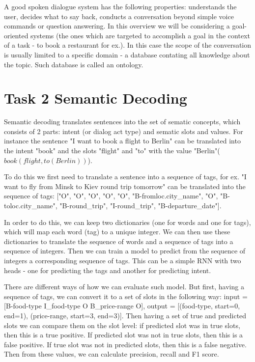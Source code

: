 \documentclass[12pt,titlepage,a4paper]{article}
\begin{document}
A good spoken dialogue system has the following properties: understands the user, decides what to say back, conducts a conversation beyond simple vo\-ice commands or question answering. 
In this overview we will be considering a goal-oriented systems (the ones which are targeted to accomplish a goal in the context of a task - to book a restaurant for ex.). In this case the scope of the conversation is usually limited to a specific domain - a database contating all knowledge about the topic. Such database is called an ontology.
\pagebreak
\section{Task 2 Semantic Decoding}
Semantic decoding translates sentences into the set of sematic concepts, which consists of 2 parts: intent (or dialog act type) and sematic slots and values. For instance the sentence "I want to book a flight to Berlin" can be translated into the intent "book" and the slots "flight" and "to" with the value "Berlin"($book(flight, to(Berlin))$).

To do this we first need to translate a sentence into a sequence of tags, for ex. "I want to fly from Minsk to Kiev round trip tomorrow" can be translated into the sequence of tags: ["O", "O", "O", "O", "O", "B-fromloc.city\_name", "O", "B-toloc.city\_name", "B-round\_trip", "I-round\_trip", "B-departure\_date"].

In order to do this, we can keep two dictionaries (one for words and one for tags), which will map each word (tag) to a unique integer. We can then use these dictionaries to translate the sequence of words and a sequence of tags into a sequence of integers. Then we can train a model to predict from the sequence of integers a corresponding sequence of tags. This can be a simple RNN with two heads - one for predicting the tags and another for predicting intent. 

There are different ways of how we can evaluate such model. But first, having a sequence of tags, we can convert it to a set of slots in the following way: input = [B-food-type I\_food-type O B\_price-range O], output = [(food-type, start=0, end=1), (price-range, start=3, end=3)]. Then having a set of true and predicted slots we can compare them on the slot level: if predicted slot was in true slots, then this is a true positive. If predicted slot was not in true slots, then this is a false positive. If true slot was not in predicted slots, then this is a false negative. Then from these values, we can calculate precision, recall and F1 score.
\end{document}
